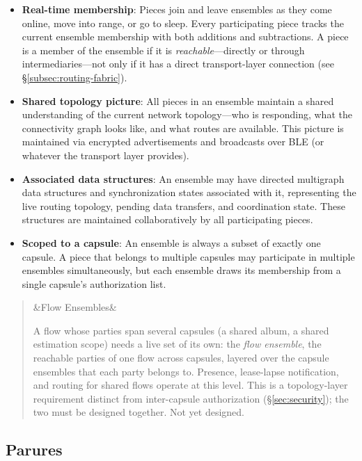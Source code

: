 \documentclass[11pt, letterpaper]{article}
\newenvironment{designnote}[1][]
  {\par\medskip\begin{quote}\small
   \ifx&#1&\else\noindent{\bfseries\color{jetcolor} #1}\par\smallskip\fi}
  {\end{quote}\medskip}
\begin{document}
\begin{itemize}[leftmargin=2em]
  \item \textbf{Real-time membership}: Pieces join and leave ensembles as they come
    online, move into range, or go to sleep. Every participating piece tracks the current
    ensemble membership with both additions and subtractions. A piece is a member of the
    ensemble if it is \emph{reachable}---directly or through intermediaries---not only if
    it has a direct transport-layer connection (see \S\ref{subsec:routing-fabric}).
  \item \textbf{Shared topology picture}: All pieces in an ensemble maintain a shared
    understanding of the current network topology---who is responding, what the
    connectivity graph looks like, and what routes are available. This picture is
    maintained via encrypted advertisements and broadcasts over BLE (or whatever the
    transport layer provides).
  \item \textbf{Associated data structures}: An ensemble may have directed multigraph
    data structures and synchronization states associated with it, representing the live
    routing topology, pending data transfers, and coordination state. These structures
    are maintained collaboratively by all participating pieces.
  \item \textbf{Scoped to a capsule}: An ensemble is always a subset of exactly one
    capsule. A piece that belongs to multiple capsules may participate in multiple
    ensembles simultaneously, but each ensemble draws its membership from a single
    capsule's authorization list.
\end{itemize}

\begin{designnote}[Flow Ensembles]
A flow whose parties span several capsules (a shared album, a shared estimation scope)
needs a live set of its own: the \emph{flow ensemble}, the reachable parties of one
flow across capsules, layered over the capsule ensembles that each party belongs to.
Presence, lease-lapse notification, and routing for shared flows operate at this level.
This is a topology-layer requirement distinct from inter-capsule authorization
(\S\ref{sec:security}); the two must be designed together. Not yet designed.
\end{designnote}

\subsection{Parures}
\end{document}
